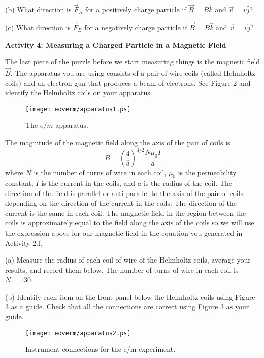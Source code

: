 \newpage

(b) What direction is $\vec F_B$ for a positively charge particle 
if $\vec B = B \hat k$ and $\vec v = v \hat j$?
\vspace{15mm}

(c) What direction is $\vec F_B$ for a negatively charge particle
if $\vec B = B \hat k$ and $\vec v = v \hat j$?
\vspace{15mm}

\textbf{Activity 4: Measuring a Charged Particle in a Magnetic Field}

The last piece of the puzzle before we start measuring things is the magnetic field
$\vec B$.
The apparatus you are using consists of a pair of wire coils (called Helmholtz coils) and
an electron gun that produces a beam of electrons.
See Figure 2 and identify the Helmholtz coils on your apparatus.
\begin{figure}[hbt]
\begin{center}

\texttt{[image: eoverm/apparatus1.ps]}

\caption{The $e/m$ apparatus.}

\end{center}
\end{figure}
The magnitude of the magnetic field along the axis of the pair of coils is
\begin{equation}
B = \left ( \frac{4}{5} \right )^{3/2} \frac{N \mu_0 I}{a}
\end{equation}
where $N$ is the number of turns of wire in each coil, $\mu_0$
is the permeability constant,  $I$ is the current in the coils,
and $a$ is the radius of the coil.
The direction of the field is parallel or anti-parallel
to the axis of the pair of coils depending on the direction of the current
in the coils.
The direction of the current is the same in each coil.
The magnetic field in the region between the coils is approximately equal
to the field along the axis of the coils so we will use
the expression above for our magnetic field in the equation you generated in
Activity 2.f.

\newpage

(a) Measure the radius of each coil of wire of the Helmholtz coils, 
average your results, and record them
below.
The number of turns of wire in each coil is $N=130$.
\vspace{15mm}


(b) Identify each item on the front panel below
the Helmholtz coils using Figure 3 as a guide.
Check that all the connections are correct using Figure 3 as your guide. 
\begin{figure}[hbt]
\begin{center}

\texttt{[image: eoverm/apparatus2.ps]}

\caption{Instrument connections for the e/m experiment.}

\end{center}
\end{figure}

